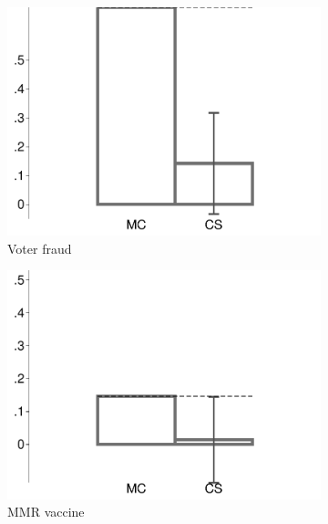\begin{figure}[t]
\begin{subfigure}{.325\textwidth}
		\includegraphics[width=\textwidth]{../figs/confidence_score_ccd_ida_ips_fraud_study1.pdf}
		\caption{Voter fraud}
	\end{subfigure}
	\hfill
	\begin{subfigure}{.325\textwidth}\centering
		\includegraphics[width=\textwidth]{../figs/confidence_score_ccd_ida_ips_mmr_study1.pdf}
		\caption{MMR vaccine}
	\end{subfigure}	
	\hfill
	\begin{subfigure}{.325\textwidth}\centering

\end{subfigure}
\end{figure}
